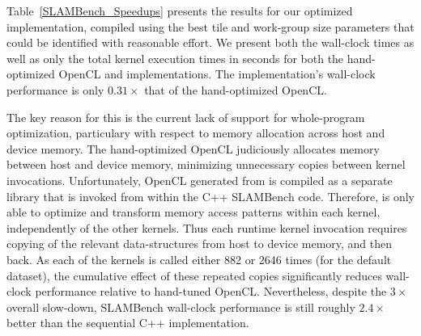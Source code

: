 \documentclass{llncs}
\begin{document}
Table~\ref{SLAMBench_Speedups} presents the results for our optimized
\pencil implementation, compiled using the best \PPCG tile and
work-group size parameters that could be identified with reasonable
effort.
We present both the wall-clock times as well as only the total kernel
execution times in seconds for both the hand-optimized OpenCL and
\pencil implementations.
The \pencil implementation's wall-clock performance is only
$0.31\times$ that of the hand-optimized OpenCL.

The key reason for this is the current lack of support for whole-program
optimization, particulary with respect to memory allocation across host
and device memory.
The hand-optimized OpenCL judiciously allocates memory between host and
device memory, minimizing unnecessary copies between kernel invocations.
Unfortunately, OpenCL generated from \pencil is compiled as a separate
library that is invoked from within the C++ SLAMBench code.
Therefore, \PPCG is only able to optimize and transform memory access
patterns within each kernel, independently of the other kernels. 
Thus each runtime kernel invocation requires copying of the relevant
data-structures from host to device memory, and then back. 
As each of the kernels is called either 882 or 2646 times (for the
default dataset), the cumulative effect of these repeated copies
significantly reduces wall-clock performance relative to hand-tuned OpenCL.
Nevertheless, despite the $3\times$ overall slow-down, \pencil SLAMBench
wall-clock performance is still roughly $2.4\times$ better than the
sequential C++ implementation.

\begin{table}[htbp]
\begin{center}
\end{center}
\vskip-0.1cm
\caption{Performance comparison of the PENCIL implementation of
         SLAMBench vs. hand-optimized OpenCL, on ARM Mali-T604.}
\label{SLAMBench_Speedups}
\vskip-0.1cm
\end{table}
\end{document}
